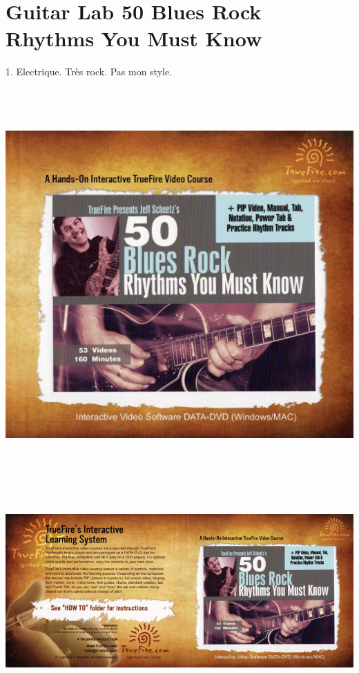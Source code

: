 \documentclass[a4paper]{book}
\begin{document}
\clearpage


\section[Guitar Lab 50 Blues Rock Rhythms You Must Know]{Guitar Lab
50 Blues Rock Rhythms You Must Know}
\hypertarget{RefHeadingToc146973218262}{}1. Electrique. Tr\`es rock. Pas
mon style.






\begin{center}
\includegraphics[width=17cm,height=15.007cm]{lebluessupportsmethodes-img82.jpg}
\end{center}






\clearpage

\begin{center}
\includegraphics[width=17cm,height=7.479cm]{lebluessupportsmethodes-img83.jpg}
\end{center}
\end{document}
